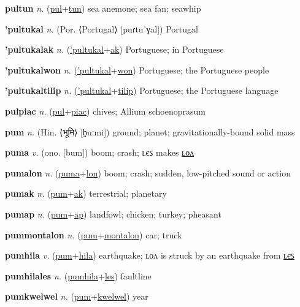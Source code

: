 \textbf{\hypertarget{pultun}{pultun}} \textit{n.} (\hyperlink{pul}{pul}+\allowbreak \hyperlink{tun}{tun})
sea anemone; sea fan; seawhip

\textbf{\hypertarget{'pultukal}{'pultukal}} \textit{n.} (Por. ⟨Portugal⟩ [puɾtuˈɣal])
Portugal

\textbf{\hypertarget{'pultukalak}{'pultukalak}} \textit{n.} (\hyperlink{'pultukal}{'pultukal}+\allowbreak \hyperlink{ak}{ak})
Portuguese; in Portuguese

\textbf{\hypertarget{'pultukalwon}{'pultukalwon}} \textit{n.} (\hyperlink{'pultukal}{'pultukal}+\allowbreak \hyperlink{won}{won})
Portuguese; the Portuguese people

\textbf{\hypertarget{'pultukaltilip}{'pultukaltilip}} \textit{n.} (\hyperlink{'pultukal}{'pultukal}+\allowbreak \hyperlink{tilip}{tilip})
Portuguese; the Portuguese language

\textbf{\hypertarget{pulpiac}{pulpiac}} \textit{n.} (\hyperlink{pul}{pul}+\allowbreak \hyperlink{piac}{piac})
chives; Allium schoenoprasum

\textbf{\hypertarget{pum}{pum}} \textit{n.} (Hin. ⟨{\devanagari{}भूमि}⟩ [b̤uːmi])
ground; planet; gravitationally-bound solid mass

\textbf{\hypertarget{puma}{puma}} \textit{v.} (ono. [bum])
boom; crash; ʟєꜱ makes \hyperlink{pumalon}{ʟᴏᴧ}

\textbf{\hypertarget{pumalon}{pumalon}} \textit{n.} (\hyperlink{puma}{puma}+\allowbreak \hyperlink{lon}{lon})
boom; crash; sudden, low-pitched sound or action

\textbf{\hypertarget{pumak}{pumak}} \textit{n.} (\hyperlink{pum}{pum}+\allowbreak \hyperlink{ak}{ak})
terrestrial; planetary

\textbf{\hypertarget{pumap}{pumap}} \textit{n.} (\hyperlink{pum}{pum}+\allowbreak \hyperlink{ap}{ap})
landfowl; chicken; turkey; pheasant

\textbf{\hypertarget{pummontalon}{pummontalon}} \textit{n.} (\hyperlink{pum}{pum}+\allowbreak \hyperlink{montalon}{montalon})
car; truck

\textbf{\hypertarget{pumhila}{pumhila}} \textit{v.} (\hyperlink{pum}{pum}+\allowbreak \hyperlink{hila}{hila})
earthquake; ʟᴏᴧ is struck by an earthquake from \hyperlink{pumhilales}{ʟєꜱ}

\textbf{\hypertarget{pumhilales}{pumhilales}} \textit{n.} (\hyperlink{pumhila}{pumhila}+\allowbreak \hyperlink{les}{les})
faultline

\textbf{\hypertarget{pumkwelwel}{pumkwelwel}} \textit{n.} (\hyperlink{pum}{pum}+\allowbreak \hyperlink{kwelwel}{kwelwel})
year

